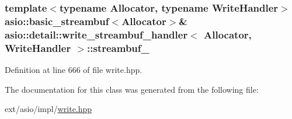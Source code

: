 \subsubsection[{streambuf\+\_\+}]{\setlength{\rightskip}{0pt plus 5cm}template$<$typename Allocator, typename Write\+Handler$>$ {\bf asio\+::basic\+\_\+streambuf}$<$Allocator$>$\& {\bf asio\+::detail\+::write\+\_\+streambuf\+\_\+handler}$<$ Allocator, Write\+Handler $>$\+::streambuf\+\_\+}\label{classasio_1_1detail_1_1write__streambuf__handler_a5398d2ea03dcbf5191fc89e167f4026b}


Definition at line 666 of file write.\+hpp.



The documentation for this class was generated from the following file\+:\begin{DoxyCompactItemize}
\item 
ext/asio/impl/\hyperlink{impl_2write_8hpp}{write.\+hpp}\end{DoxyCompactItemize}
